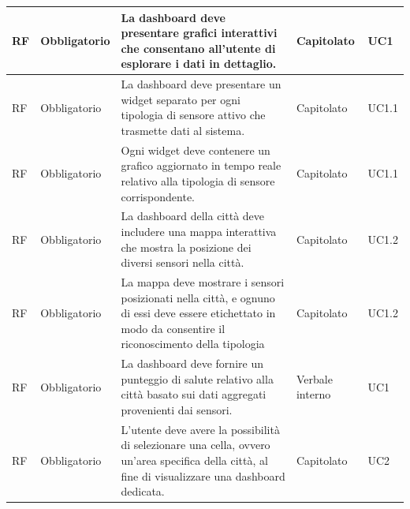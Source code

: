 \documentclass{article}
\begin{document}
\begin{longtable}{|C{1cm}|C{2cm}|>{\raggedright}m{5cm}|C{1.5cm}|C{2cm}|}
    \hline
     RF & Obbligatorio        & La dashboard deve presentare grafici interattivi che consentano all'utente di esplorare i dati in dettaglio.                                                                                                                       & Capitolato      & UC1               \\
    \hline
     RF & Obbligatorio        & La dashboard deve presentare un widget separato per ogni tipologia di sensore attivo che trasmette dati al sistema.                                                                                                                & Capitolato      & UC1.1               \\
    \hline
     RF & Obbligatorio        & Ogni widget deve contenere un grafico aggiornato in tempo reale relativo alla tipologia di sensore corrispondente.                                                                                                                 & Capitolato      & UC1.1               \\
    \hline
     RF & Obbligatorio        & La dashboard della città deve includere una mappa interattiva che mostra la posizione dei diversi sensori nella città.                                                                                                             & Capitolato      & UC1.2                   \\
    \hline
     RF & Obbligatorio        & La mappa deve mostrare i sensori posizionati nella città, e ognuno di essi deve essere etichettato in modo da consentire il riconoscimento della tipologia                                                                         & Capitolato      & UC1.2               \\
    \hline
     RF & Obbligatorio        & La dashboard deve fornire un punteggio di salute relativo alla città basato sui dati aggregati provenienti dai sensori.                                                                                                            & Verbale interno & UC1                    \\
    \hline
    \hline
     RF & Obbligatorio        & L'utente deve avere la possibilità di selezionare una cella, ovvero un'area specifica della città, al fine di visualizzare una dashboard dedicata.& Capitolato      & UC2              \\

\end{longtable}
\end{document}
